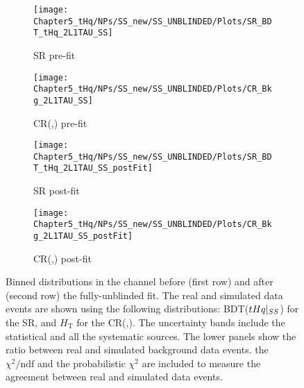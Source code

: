 \begin{figure}[ht]
    \centering
    \begin{subfigure}[b]{0.42\textwidth}
        \centering
        \texttt{[image: Chapter5\_tHq/NPs/SS\_new/SS\_UNBLINDED/Plots/SR\_BDT\_tHq\_2L1TAU\_SS]}
        \caption{SR pre-fit}
        \label{fig:ChaptH:fitToData:SS:prepostfit:prefit:SR}
    \end{subfigure}
    \hfill 
    \begin{subfigure}[b]{0.42\textwidth}
        \centering
        \texttt{[image: Chapter5\_tHq/NPs/SS\_new/SS\_UNBLINDED/Plots/CR\_Bkg\_2L1TAU\_SS]}
        \caption{CR(\ttbar,\ttX) pre-fit}
        \label{fig:ChaptH:fitToData:SS:prepostfit:prefit:CRtt}
    \end{subfigure}
    
    \begin{subfigure}[b]{0.42\textwidth}
        \centering
        \texttt{[image: Chapter5\_tHq/NPs/SS\_new/SS\_UNBLINDED/Plots/SR\_BDT\_tHq\_2L1TAU\_SS\_postFit]}
        \caption{SR post-fit}
        \label{fig:ChaptH:fitToData:SS:prepostfit:postfit:SR}
    \end{subfigure}
    \hfill
    \begin{subfigure}[b]{0.42\textwidth}
        \centering
        \texttt{[image: Chapter5\_tHq/NPs/SS\_new/SS\_UNBLINDED/Plots/CR\_Bkg\_2L1TAU\_SS\_postFit]}
        \caption{CR(\ttbar,\ttX) post-fit}
        \label{fig:ChaptH:fitToData:SS:prepostfit:postfit:CRtt}
    \end{subfigure}
    \caption{Binned distributions in the \dilepSStau channel before (first row) and after (second row) the fully-unblinded fit.
    The real and simulated data events are shown using the following distributions: BDT($tHq|_{SS}$) for the SR, 
    and $H_{\text{T}}$ for the CR(\ttbar,\ttX). The uncertainty bands include the statistical and 
    all the systematic sources. The lower panels show the ratio between real and simulated background data events.
    the $\chi^{2}/\text{ndf}$ and the probabilistic $\chi^{2}$ are included to measure the agreement between 
    real and simulated data events.}
    \label{fig:ChaptH:fitToData:SS:prepostfit}
\end{figure}








